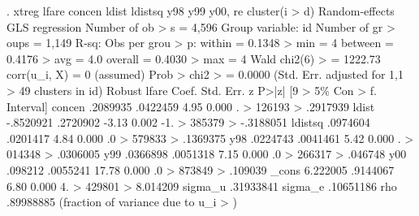 . xtreg lfare concen ldist ldistsq y98 y99 y00, re cluster(i
> d)
{\smallskip}
Random-effects GLS regression                   Number of ob
> s     =      4,596
Group variable: id                              Number of gr
> oups  =      1,149
{\smallskip}
R-sq:                                           Obs per grou
> p:
     within  = 0.1348                                       
>   min =          4
     between = 0.4176                                       
>   avg =        4.0
     overall = 0.4030                                       
>   max =          4
{\smallskip}
                                                Wald chi2(6)
>       =    1222.73
corr(u_i, X)   = 0 (assumed)                    Prob > chi2 
>       =     0.0000
{\smallskip}
                                 (Std. Err. adjusted for 1,1
> 49 clusters in id)
             {\VBAR}               Robust
       lfare {\VBAR}      Coef.   Std. Err.      z    P>|z|     [9
> 5\% Con                                                    
>       f. Interval]
      concen {\VBAR}   .2089935   .0422459     4.95   0.000      .
> 126193                                                    
>           .2917939
       ldist {\VBAR}  -.8520921   .2720902    -3.13   0.002    -1.
> 385379                                                    
>          -.3188051
     ldistsq {\VBAR}   .0974604   .0201417     4.84   0.000     .0
> 579833                                                    
>           .1369375
         y98 {\VBAR}   .0224743   .0041461     5.42   0.000      .
> 014348                                                    
>           .0306005
         y99 {\VBAR}   .0366898   .0051318     7.15   0.000     .0
> 266317                                                    
>            .046748
         y00 {\VBAR}    .098212   .0055241    17.78   0.000     .0
> 873849                                                    
>            .109039
       _cons {\VBAR}   6.222005   .9144067     6.80   0.000     4.
> 429801                                                    
>           8.014209
     sigma_u {\VBAR}  .31933841
     sigma_e {\VBAR}  .10651186
         rho {\VBAR}  .89988885   (fraction of variance due to u_i
> )
{\smallskip}
